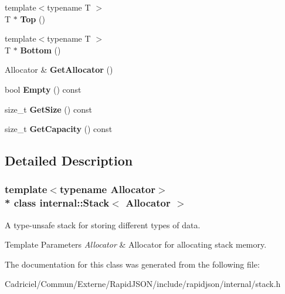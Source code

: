 \begin{DoxyCompactItemize}
\item 
{\footnotesize template$<$typename T $>$ }\\T $\ast$ {\bfseries Top} ()\hypertarget{classinternal_1_1_stack_ab3ed5b4afed3c73c516678516d5e195b}{}\label{classinternal_1_1_stack_ab3ed5b4afed3c73c516678516d5e195b}

\item 
{\footnotesize template$<$typename T $>$ }\\T $\ast$ {\bfseries Bottom} ()\hypertarget{classinternal_1_1_stack_a10aa1bc716b82cb0a40b3a3b9d5efe87}{}\label{classinternal_1_1_stack_a10aa1bc716b82cb0a40b3a3b9d5efe87}

\item 
Allocator \& {\bfseries Get\+Allocator} ()\hypertarget{classinternal_1_1_stack_ab01f693833dfe136f574d66547623cfa}{}\label{classinternal_1_1_stack_ab01f693833dfe136f574d66547623cfa}

\item 
bool {\bfseries Empty} () const \hypertarget{classinternal_1_1_stack_abf57d1c7b356d8acbbe0e79147ca4b5c}{}\label{classinternal_1_1_stack_abf57d1c7b356d8acbbe0e79147ca4b5c}

\item 
size\+\_\+t {\bfseries Get\+Size} () const \hypertarget{classinternal_1_1_stack_ade4a25fa82950619652a30aa3a807f58}{}\label{classinternal_1_1_stack_ade4a25fa82950619652a30aa3a807f58}

\item 
size\+\_\+t {\bfseries Get\+Capacity} () const \hypertarget{classinternal_1_1_stack_a61dea1ed780c07bb438d17c581ab0e48}{}\label{classinternal_1_1_stack_a61dea1ed780c07bb438d17c581ab0e48}

\end{DoxyCompactItemize}


\subsection{Detailed Description}
\subsubsection*{template$<$typename Allocator$>$\\*
class internal\+::\+Stack$<$ Allocator $>$}

A type-\/unsafe stack for storing different types of data. 


\begin{DoxyTemplParams}{Template Parameters}
{\em Allocator} & Allocator for allocating stack memory. \\
\hline
\end{DoxyTemplParams}


The documentation for this class was generated from the following file\+:\begin{DoxyCompactItemize}
\item 
Cadriciel/\+Commun/\+Externe/\+Rapid\+J\+S\+O\+N/include/rapidjson/internal/stack.\+h\end{DoxyCompactItemize}
